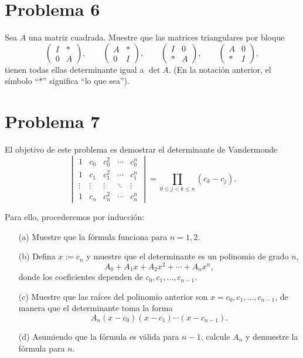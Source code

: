 \documentclass[11pt]{article}
\theoremstyle{definition} %
\begin{document}
\section*{Problema 6}
Sea \(A\) una matriz cuadrada. Muestre que las matrices triangulares por bloque
\[
  \begin{pmatrix} I & \ast\\[2pt] 0 & A\end{pmatrix},\qquad
  \begin{pmatrix} A & \ast\\[2pt] 0 & I\end{pmatrix},\qquad
  \begin{pmatrix} I & 0\\[2pt] \ast & A\end{pmatrix},\qquad
  \begin{pmatrix} A & 0\\[2pt] \ast & I\end{pmatrix},
\]
tienen todas ellas determinante igual a \(\det A\). (En la notación anterior, el símbolo ``\(\ast\)'' significa ``lo que sea'').

\section*{Problema 7}
El objetivo de este problema es demostrar el determinante de Vandermonde
\[
  \begin{vmatrix}
    1 & c_0 & c_0^2 & \cdots & c_0^n\\[4pt]
    1 & c_1 & c_1^2 & \cdots & c_1^n\\[4pt]
    \vdots & \vdots & \vdots & \ddots & \vdots\\[4pt]
    1 & c_n & c_n^2 & \cdots & c_n^n
  \end{vmatrix}
  = \prod_{0\le j<k\le n} (c_k-c_j).
\]

Para ello, procederemos por inducción:
\begin{enumerate}
  \item[(a)] Muestre que la fórmula funciona para \(n=1,2\).
  \item[(b)] Defina \(x:=c_n\) y muestre que el determinante es un polinomio de grado \(n\),
  \[
    A_0 + A_1 x + A_2 x^2 + \cdots + A_n x^n,
  \]
  donde los coeficientes dependen de \(c_0,c_1,\dots,c_{n-1}\).
  \item[(c)] Muestre que las raíces del polinomio anterior son \(x=c_0,c_1,\dots,c_{n-1}\), de manera que el determinante toma la forma
  \[
    A_n (x-c_0)(x-c_1)\cdots(x-c_{n-1}).
  \]
  \item[(d)] Asumiendo que la fórmula es válida para \(n-1\), calcule \(A_n\) y demuestre la fórmula para \(n\).
\end{enumerate}

 
\end{document}
